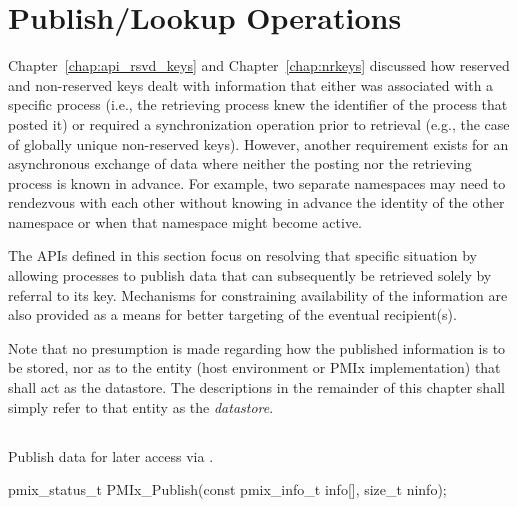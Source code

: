 \chapter{Publish/Lookup Operations}
\label{chap:pub}

Chapter~\ref{chap:api_rsvd_keys} and Chapter~\ref{chap:nrkeys} discussed how reserved and non-reserved keys dealt with
information that either was associated with a specific process (i.e., the
retrieving process knew the identifier of the process that posted it) or
required a synchronization operation prior to retrieval (e.g., the case of
globally unique non-reserved keys). However, another requirement exists for an
asynchronous exchange of data where neither the posting nor the retrieving
process is known in advance. For example, two separate namespaces may need to
rendezvous with each other without knowing in advance the identity of the other
namespace or when that namespace might become active.

The \acp{API} defined in this section focus on resolving that specific
situation by allowing processes to publish data that can subsequently be
retrieved solely by referral to its key. Mechanisms for constraining
availability of the information are also provided as a means for better
targeting of the eventual recipient(s).

Note that no presumption is made regarding how the published information is to be stored, nor as to the entity (host environment or \ac{PMIx} implementation) that shall act as the datastore. The descriptions in the remainder of this chapter shall simply refer to that entity as the \emph{datastore}.


\section{}

\summary

Publish data for later access via .

\format

\cspecificstart
\begin{codepar}
pmix_status_t
PMIx_Publish(const pmix_info_t info[], size_t ninfo);
\end{codepar}
\cspecificend

